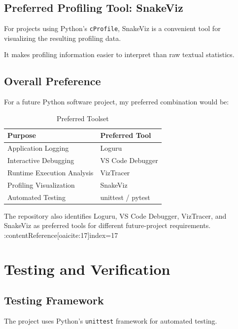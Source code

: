\documentclass[12pt,a4paper]{report}
\begin{document}
\section{Preferred Profiling Tool: SnakeViz}

For projects using Python's \texttt{cProfile}, SnakeViz is a convenient
tool for visualizing the resulting profiling data.

It makes profiling information easier to interpret than raw textual
statistics.

\section{Overall Preference}

For a future Python software project, my preferred combination would
be:

\begin{table}[H]
\centering
\caption{Preferred Toolset}
\begin{tabular}{p{4cm}p{7cm}}
\toprule
\textbf{Purpose} & \textbf{Preferred Tool} \\
\midrule
Application Logging & Loguru \\
Interactive Debugging & VS Code Debugger \\
Runtime Execution Analysis & VizTracer \\
Profiling Visualization & SnakeViz \\
Automated Testing & unittest / pytest \\
\bottomrule
\end{tabular}
\end{table}

The repository also identifies Loguru, VS Code Debugger, VizTracer,
and SnakeViz as preferred tools for different future-project
requirements. :contentReference[oaicite:17]{index=17}


\chapter{Testing and Verification}

\section{Testing Framework}

The project uses Python's \texttt{unittest} framework for automated
testing.
\end{document}
